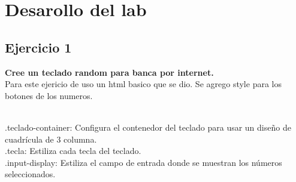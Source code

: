 \documentclass{article}
\begin{document}
\section{Desarollo del lab}
\subsection{Ejercicio 1}
\textbf{Cree un teclado random para banca por internet. }
\\Para este ejericio de uso un html basico que se dio. Se agrego style para los botones de los numeros.

\\.teclado-container: Configura el contenedor del teclado para usar un diseño de cuadrícula de 3 columna.
\\.tecla: Estiliza cada tecla del teclado.
\\.input-display: Estiliza el campo de entrada donde se muestran los números seleccionados.
\end{document}
